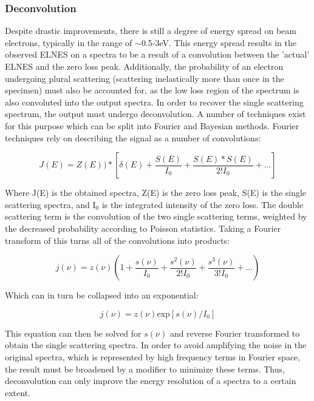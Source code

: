 \subsubsection{Deconvolution} \label{deconvolution}
Despite drastic improvements, there is still a degree of energy spread on beam electrons, typically in the range of $\sim$0.5-3eV.  This energy spread results in the observed ELNES on a spectra to be a result of a convolution between the 'actual' ELNES and the zero loss peak.  Additionally, the probability of an electron undergoing plural scattering (scattering inelastically more than once in the specimen) must also be accounted for, as the low loss region of the spectrum is also convoluted into the output spectra.  In order to recover the single scattering spectrum, the output must undergo deconvolution.  A number of techniques exist for this purpose which can be split into Fourier and Bayesian methods.   Fourier techniques rely on describing the signal as a number of convolutions:

\begin{equation}
 	J(E) = Z(E))\ast[\delta(E) + \frac{S(E)}{I_0} +  \frac{S(E) \ast S(E)}{2! I_0}   + ...]
\end{equation}



Where J(E) is the obtained spectra, Z(E) is the zero loss peak, S(E) is the single scattering spectra, and I$_0$ is the integrated intensity of the zero loss.  The double scattering term is the convolution of the two single scattering terms, weighted by the decreased probability according to Poisson statistics.   Taking a Fourier transform of this turns all of the convolutions into products: 

\begin{equation}
	j(\nu) = z(\nu) \left(1+\frac{s(\nu)}{I_0}+   \frac{s^2(\nu)}{2! I_0}+ \frac{s^3(\nu)}{3! I_0} + ...\right)
	\label{fourier_spectra}
\end{equation} 

Which can in turn be collapsed into an exponential:

\begin{equation}
	j(\nu) = z(\nu)\mathrm{exp}[s(\nu)/I_0]
\end{equation}

This equation can then be solved for $s(\nu)$ and reverse Fourier transformed to obtain the single scattering spectra.  In order to avoid amplifying the noise in the original spectra, which is represented by high frequency terms in Fourier space, the result must be broadened by a modifier to minimize these terms.  Thus, deconvolution can only improve the energy resolution of a spectra to a certain extent.  

